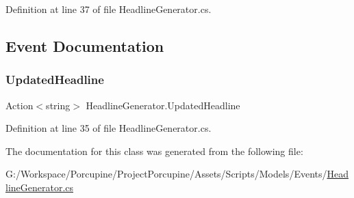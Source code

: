 Definition at line 37 of file Headline\+Generator.\+cs.



\subsection{Event Documentation}
\mbox{\label{class_headline_generator_a1b9116cf3bc873ce28fbf5120f844c86}} 
\subsubsection{\texorpdfstring{Updated\+Headline}{UpdatedHeadline}}
{\footnotesize\ttfamily Action$<$string$>$ Headline\+Generator.\+Updated\+Headline}



Definition at line 35 of file Headline\+Generator.\+cs.



The documentation for this class was generated from the following file\+:\begin{DoxyCompactItemize}
\item 
G\+:/\+Workspace/\+Porcupine/\+Project\+Porcupine/\+Assets/\+Scripts/\+Models/\+Events/\hyperlink{_headline_generator_8cs}{Headline\+Generator.\+cs}\end{DoxyCompactItemize}
